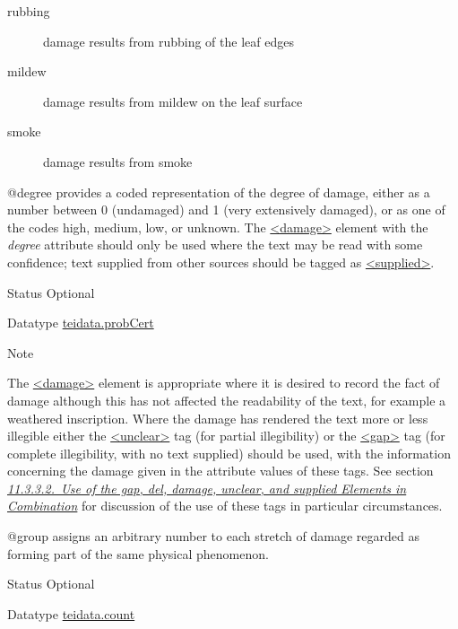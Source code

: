\begin{reflist}
\begin{sansreflist}
\begin{reflist}
\begin{description}
\item[{rubbing}]damage results from rubbing of the leaf edges
\item[{mildew}]damage results from mildew on the leaf surface
\item[{smoke}]damage results from smoke
\end{description} 
\end{reflist}  
    \item[@degree]
  provides a coded representation of the degree of damage, either as a number between 0 (undamaged) and 1 (very extensively damaged), or as one of the codes high, medium, low, or unknown. The \hyperref[TEI.damage]{<damage>} element with the {\itshape degree} attribute should only be used where the text may be read with some confidence; text supplied from other sources should be tagged as \hyperref[TEI.supplied]{<supplied>}.
\begin{reflist}
    \item[{Status}]
  Optional
    \item[{Datatype}]
  \hyperref[TEI.teidata.probCert]{teidata.probCert}
    \item[{Note}]
  \par
The \hyperref[TEI.damage]{<damage>} element is appropriate where it is desired to record the fact of damage although this has not affected the readability of the text, for example a weathered inscription. Where the damage has rendered the text more or less illegible either the \hyperref[TEI.unclear]{<unclear>} tag (for partial illegibility) or the \hyperref[TEI.gap]{<gap>} tag (for complete illegibility, with no text supplied) should be used, with the information concerning the damage given in the attribute values of these tags. See section \textit{\hyperref[PHCOMB]{11.3.3.2.\ Use of the gap, del, damage, unclear, and supplied Elements in Combination}} for discussion of the use of these tags in particular circumstances.
\end{reflist}  
    \item[@group]
  assigns an arbitrary number to each stretch of damage regarded as forming part of the same physical phenomenon.
\begin{reflist}
    \item[{Status}]
  Optional
    \item[{Datatype}]
  \hyperref[TEI.teidata.count]{teidata.count}
\end{reflist}  
\end{sansreflist}  
\end{reflist}  
